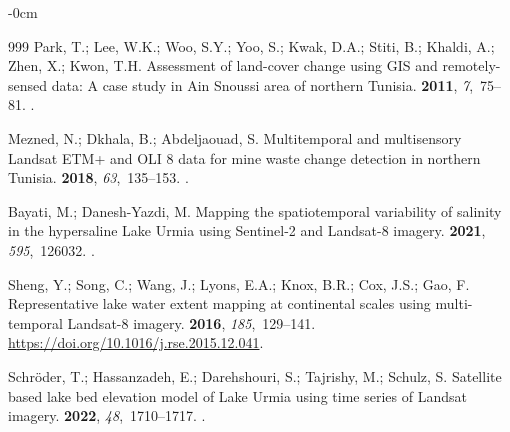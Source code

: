 \documentclass[land,article,accept,pdftex,moreauthors]{Definitions/mdpi}
\begin{document}
\begin{adjustwidth}{-\extralength}{0cm}
\begin{thebibliography}{999}
Park, T.; Lee, W.K.; Woo, S.Y.; Yoo, S.; Kwak, D.A.; Stiti, B.; Khaldi, A.;
  Zhen, X.; Kwon, T.H.
\newblock Assessment of land-cover change using GIS and remotely-sensed data: A
  case study in Ain Snoussi area of northern Tunisia.
 {\bf 2011}, {\em 7},~75--81.
.

Mezned, N.; Dkhala, B.; Abdeljaouad, S.
\newblock Multitemporal and multisensory Landsat ETM+ and OLI 8 data for mine
  waste change detection in northern Tunisia.
 {\bf 2018}, {\em 63},~135--153.
.

Bayati, M.; Danesh-Yazdi, M.
\newblock Mapping the spatiotemporal variability of salinity in the hypersaline
  Lake Urmia using Sentinel-2 and Landsat-8 imagery.
 {\bf 2021}, {\em 595},~126032.
.

Sheng, Y.; Song, C.; Wang, J.; Lyons, E.A.; Knox, B.R.; Cox, J.S.; Gao, F.
\newblock Representative lake water extent mapping at continental scales using
  multi-temporal Landsat-8 imagery.
 {\bf 2016}, {\em 185},~129--141.
\newblock %
  {\url{https://doi.org/10.1016/j.rse.2015.12.041}}.

Schröder, T.; Hassanzadeh, E.; Darehshouri, S.; Tajrishy, M.; Schulz, S.
\newblock Satellite based lake bed elevation model of Lake Urmia using time
  series of Landsat imagery.
 {\bf 2022}, {\em
  48},~1710--1717.
.

\end{thebibliography}
\PublishersNote{}

\end{adjustwidth}
\end{document}
